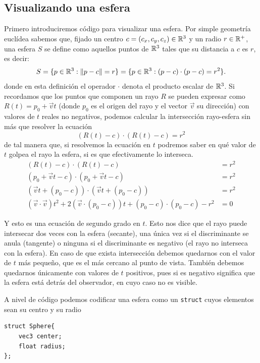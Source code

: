 \subsection{Visualizando una esfera}
\label{subsection:esfera}

Primero introduciremos código para visualizar una esfera. Por simple geometría euclídea sabemos que, fijado un centro $c=(c_x,c_y,c_z)\in\mathbb{R}^3$ y un radio $r\in\mathbb{R}^+$, una esfera $S$ se define como aquellos puntos de $\mathbb{R}^3$ tales que su distancia a $c$ es $r$, es decir:
$$
S = \{p\in\mathbb{R}^3:\|p-c\|=r\} = \{p\in\mathbb{R}^3:(p-c)\cdot (p-c)=r^2\}. 
$$
donde en esta definición el operador $\cdot$ denota el producto escalar de $\mathbb{R}^3$. Si recordamos que los puntos que componen un rayo $R$ se pueden expresar como $R(t)= p_0 + \vec vt$ (donde $p_0$ es el origen del rayo y el vector $\vec v$ su dirección) con valores de $t$ reales no negativos, podemos calcular la intersección rayo-esfera sin más que resolver la ecuación
$$
(R(t)-c)\cdot(R(t)-c)=r^2
$$
de tal manera que, si resolvemos la ecuación en $t$ podremos saber en qué valor de $t$ golpea el rayo la esfera, si es que efectivamente lo interseca.
\begin{equation}
    \label{eq:rayo-recta}
    \begin{split}
        (R(t)-c)\cdot(R(t)-c)&=r^2 \\
        (p_0 + \vec vt - c)\cdot(p_0 + \vec vt - c) &= r^2 \\
        (\vec vt + (p_0 -c))\cdot (\vec vt + (p_0 -c))&= r^2 \\
        (\vec v\cdot \vec v)t^2 + 2(\vec v\cdot(p_0-c))t + (p_0 -c)\cdot (p_0 -c) - r^2 &= 0 
    \end{split}
\end{equation}

Y esto es una ecuación de segundo grado en $t$. Esto nos dice que el rayo puede intersecar dos veces con la esfera (secante), una única vez si el discriminante se anula (tangente) o ninguna si el discriminante es negativo (el rayo no interseca con la esfera). En caso de que exista intersección debemos quedarnos con el valor de $t$ más pequeño, que es el más cercano al punto de vista. También debemos quedarnos únicamente con valores de $t$ positivos, pues si es negativo significa que la esfera está detrás del observador, en cuyo caso no es visible.

A nivel de código podemos codificar una esfera como un \verb|struct| cuyos elementos sean su centro y su radio

\begin{lstlisting}
struct Sphere{
    vec3 center;
    float radius;
};
\end{lstlisting}

